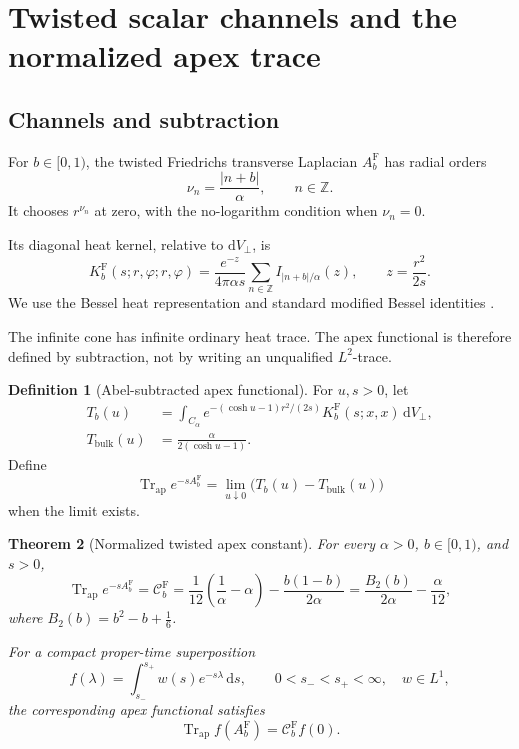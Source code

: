\documentclass[11pt,a4paper]{article}
\newcommand{\ZZ}{\mathbb Z}
\newcommand{\dd}{\mathrm d}
\newcommand{\Fr}{\mathrm F}
\newcommand{\ApTr}{\operatorname{Tr}_{\mathrm{ap}}}
\newcommand{\abs}[1]{\lvert#1\rvert}
\newcommand{\Ccal}{\mathcal C}
\theoremstyle{plain}
\newtheorem{theorem}{Theorem}[section]
\theoremstyle{definition}
\newtheorem{definition}[theorem]{Definition}
\theoremstyle{remark}
\numberwithin{equation}{section}
\begin{document}
\section{Twisted scalar channels and the normalized apex trace}
\label{sec:heat}

\subsection{Channels and subtraction}

For \(b\in[0,1)\), the twisted Friedrichs transverse Laplacian
\(A_b^\Fr\) has radial orders
\[
 \nu_n=\frac{\abs{n+b}}{\alpha},\qquad n\in\ZZ.
\]
It chooses \(r^{\nu_n}\) at zero, with the no-logarithm condition
when \(\nu_n=0\).

Its diagonal heat kernel, relative to \(\dd V_\perp\), is
\begin{equation}
 K_b^\Fr(s;r,\varphi;r,\varphi)
 =\frac{e^{-z}}{4\pi\alpha s}
   \sum_{n\in\ZZ}I_{\abs{n+b}/\alpha}(z),
 \qquad z=\frac{r^2}{2s}.
 \label{eq:kernel}
\end{equation}
We use the Bessel heat representation and standard modified
Bessel identities \cite{DLMF,DerezinskiRichard}.

The infinite cone has infinite ordinary heat trace. The apex
functional is therefore defined by subtraction, not by writing an
unqualified \(L^2\)-trace.

\begin{definition}[Abel-subtracted apex functional]
\label{def:Abel}
For \(u,s>0\), let
\begin{align}
 T_b(u)
 &=\int_{C_\alpha}
 e^{-(\cosh u-1)r^2/(2s)}
 K_b^\Fr(s;x,x)\,\dd V_\perp,\\
 T_{\mathrm{bulk}}(u)
 &=\frac{\alpha}{2(\cosh u-1)}.
\end{align}
Define
\[
 \ApTr e^{-sA_b^\Fr}
 =\lim_{u\downarrow0}
       \bigl(T_b(u)-T_{\mathrm{bulk}}(u)\bigr)
\]
when the limit exists.
\end{definition}

\begin{theorem}[Normalized twisted apex constant]
\label{thm:C}
For every \(\alpha>0\), \(b\in[0,1)\), and \(s>0\),
\begin{equation}
 \ApTr e^{-sA_b^\Fr}
 =\Ccal_b^\Fr
 =\frac{1}{12}\left(\frac1\alpha-\alpha\right)
       -\frac{b(1-b)}{2\alpha}
 =\frac{B_2(b)}{2\alpha}-\frac{\alpha}{12},
 \label{eq:C}
\end{equation}
where \(B_2(b)=b^2-b+\tfrac16\).

For a compact proper-time superposition
\[
 f(\lambda)=\int_{s_-}^{s_+}w(s)e^{-s\lambda}\,\dd s,
 \qquad 0<s_-<s_+<\infty,\quad w\in L^1,
\]
the corresponding apex functional satisfies
\begin{equation}
 \ApTr f(A_b^\Fr)=\Ccal_b^\Fr f(0).
 \label{eq:Cfunctional}
\end{equation}
\end{theorem}
\end{document}
